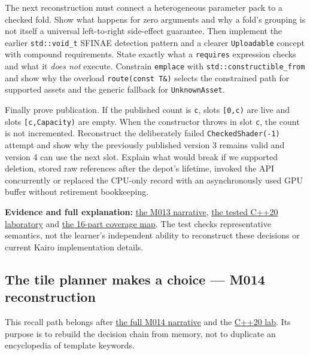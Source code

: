 The next reconstruction must connect a heterogeneous parameter pack to a checked fold. Show what happens for zero arguments and why a fold's grouping is not itself a universal left-to-right side-effect guarantee. Then implement the earlier \texttt{std::void\_t} SFINAE detection pattern and a clearer \texttt{Uploadable} concept with compound requirements. State exactly what a \texttt{requires} expression checks and what it \emph{does not} execute. Constrain \texttt{emplace} with \texttt{std::constructible\_from} and show why the overload \texttt{route(const\ T\&)} selects the constrained path for supported assets and the generic fallback for \texttt{UnknownAsset}.

Finally prove publication. If the published count is \texttt{c}, slots \texttt{{[}0,c)} are live and slots \texttt{{[}c,Capacity)} are empty. When the constructor throws in slot \texttt{c}, the count is not incremented. Reconstruct the deliberately failed \texttt{CheckedShader(-1)} attempt and show why the previously published version 3 remains valid and version 4 can use the next slot. Explain what would break if we supported deletion, stored raw references after the depot's lifetime, invoked the API concurrently or replaced the CPU-only record with an asynchronously used GPU buffer without retirement bookkeeping.

\textbf{Evidence and full explanation:} \hyperref[01-foundations-i-ch005-one-asset-pipeline-many-asset-types-generic-code-without-accidental-promises]{the M013 narrative}, \hyperref[source-file-a5db53514d74ae247b4ac42f]{the tested C++20 laboratory} and \hyperref[appendix-fd090d982a15-m013-parts-201216-generic-asset-preparation-with-constrained-apis]{the 16-part coverage map}. The test checks representative semantics, not the learner's independent ability to reconstruct these decisions or current Kairo implementation details.

\subsection{The tile planner makes a choice --- M014 reconstruction}\label{appendix-960160274237-the-tile-planner-makes-a-choice-m014-reconstruction}

This recall path belongs after \hyperref[01-foundations-i-ch005-a-texture-tile-that-chooses-its-work-before-the-frame-begins]{the full M014 narrative} and the \hyperref[source-file-f5eb017280bb6b2ae6b1475d]{C++20 lab}. Its purpose is to rebuild the decision chain from memory, not to duplicate an encyclopedia of template keywords.


